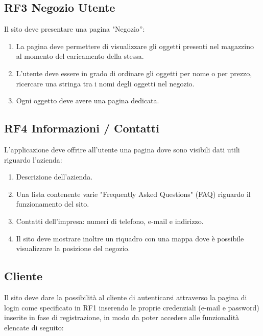 \documentclass{report}
\begin{document}
\subsection*{RF3 Negozio Utente}
Il sito deve presentare una pagina "Negozio”: 

\begin{enumerate}
	\item La pagina deve permettere di visualizzare gli oggetti presenti nel magazzino al momento del caricamento della stessa.
	
	\item L’utente deve essere in grado di ordinare gli oggetti per nome o per prezzo, ricercare una stringa tra i nomi degli oggetti nel negozio.
	
	\item Ogni oggetto deve avere una pagina dedicata.
\end{enumerate}


\subsection*{RF4 Informazioni / Contatti}
L’applicazione deve offrire all’utente una pagina dove sono visibili dati utili riguardo l'azienda:

\begin{enumerate}
	\item Descrizione dell'azienda.
	\item Una lista contenente varie "Frequently Asked Questions" (FAQ) riguardo il funzionamento del sito.
	\item Contatti dell’impresa: numeri di telefono, e-mail e indirizzo.
	\item Il sito deve mostrare inoltre un riquadro con una mappa dove è possibile visualizzare la posizione del negozio.
\end{enumerate}


\subsection{Cliente}
Il sito deve dare la possibilità al cliente di autenticarsi attraverso la pagina di login come specificato in RF1 inserendo le proprie credenziali (e-mail e password) inserite in fase di registrazione, in modo da poter accedere alle funzionalità elencate di seguito:
\end{document}
